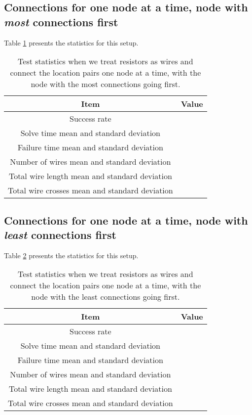 \subsection{Connections for one node at a time, node with \textit{most}
connections first}

Table \ref{tb:as_wire_node_d} presents the statistics for this setup.

\begin{table}[H]
\begin{center}
\begin{singlespace}
\begin{tabular}{| c | c |}
\hline
Item & Value \\
\hline\hline
Success rate & \\
Solve time mean and standard deviation & \\
Failure time mean and standard deviation & \\
Number of wires mean and standard deviation & \\
Total wire length mean and standard deviation & \\
Total wire crosses mean and standard deviation & \\
\hline
\end{tabular}
\end{singlespace}
\end{center}
\label{tb:as_wire_node_d}
\caption{Test statistics when we treat resistors as wires and connect the
location pairs one node at a time, with the node with the most connections going
first.}
\end{table}

\subsection{Connections for one node at a time, node with \textit{least}
connections first}

Table \ref{tb:as_wire_node_a} presents the statistics for this setup.

\begin{table}[H]
\begin{center}
\begin{singlespace}
\begin{tabular}{| c | c |}
\hline
Item & Value \\
\hline\hline
Success rate & \\
Solve time mean and standard deviation & \\
Failure time mean and standard deviation & \\
Number of wires mean and standard deviation & \\
Total wire length mean and standard deviation & \\
Total wire crosses mean and standard deviation & \\
\hline
\end{tabular}
\end{singlespace}
\end{center}
\label{tb:as_wire_node_a}
\caption{Test statistics when we treat resistors as wires and connect the
location pairs one node at a time, with the node with the least connections
going first.}
\end{table}

